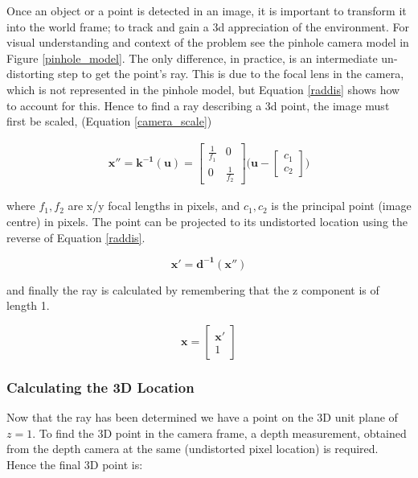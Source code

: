 \documentclass[11pt,twoside]{report}
\begin{document}
Once an object or a point is detected in an image, it is important to transform it into the world frame; to track and gain a 3d appreciation of the environment. For visual understanding and context  of the problem see the pinhole camera model in Figure \ref{pinhole_model}. The only difference, in practice, is an intermediate un-distorting step to get the point's ray. This is due to the focal lens in the camera, which is not represented in the pinhole model, but Equation \ref{raddis} shows how to account for this. Hence to find a ray describing a 3d point, the image must first be scaled, (Equation \ref{camera_scale})


\begin{equation}
\begin{aligned}
\mathbf{x''} = \mathbf{k^{-1}(u)} = 
\begin{bmatrix}
\frac{1}{f_{1}} & 0 \\[0.3em]
0 & \frac{1}{f_{2}}
\end{bmatrix}
\bigg (
\mathbf{u} -
\begin{bmatrix}
c_{1} \\[0.3em]
c_{2}
\end{bmatrix}
\bigg )
\end{aligned}
\label{camera_scale}
\end{equation}

where $f_{1},f_{2}$ are x/y focal lengths in pixels, and $c_{1},c_{2}$ is the principal point (image centre) in pixels. The point can be projected to its undistorted location using the reverse of Equation \ref{raddis}.

\begin{equation}
\mathbf{x'} = \mathbf{d^{-1}(x'')}
\label{camera_scale2}
\end{equation}

and finally the ray is calculated by remembering that the z component is of length 1.

\begin{equation}
\mathbf{x} = 
\begin{bmatrix}
\mathbf{x'} \\
1
\end{bmatrix}
\label{to_3d_ray}
\end{equation}

\subsubsection{Calculating the 3D Location}

Now that the ray has been determined we have a point on the 3D unit plane of $z=1$. To find the 3D point in the camera frame, a depth measurement, obtained from the depth camera at the same (undistorted pixel location) is required. Hence the final 3D point is:
\end{document}
